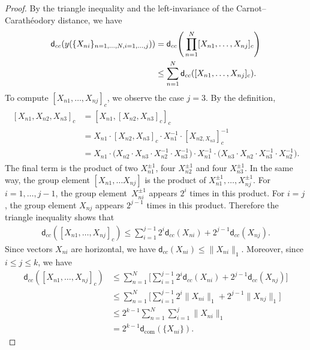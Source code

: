 \documentclass[10pt,a4paper]{amsart}
\numberwithin{equation}{section}
\begin{document}
\begin{proof}
 By the triangle inequality and the left-invariance of the Carnot--Carath\'eodory distance,
 we have
 \begin{align}
 \mathsf{d}_{cc}(y(\{X_{ni}\}_{n=1,\dots,N,i=1,\dots,j}))&=\mathsf{d}_{cc}
 \Bigg(\prod_{n=1}^N[X_{n1},\dots,X_{nj}]_c\Bigg) \notag \\
 &\leq \sum_{n=1}^N\mathsf{d}_{cc}([X_{n1},\dots,X_{nj}]_c).\label{eqyntri}
 \end{align}
 To compute $[X_{n1},\dots,X_{nj}]_c$,
 we observe the case $j=3$.
By the definition,
\begin{align*}
\begin{split}
 [X_{n1},X_{n2},X_{n3}]_c&=[X_{n1},[X_{n2},X_{n3}]_c]_c
 \\
 &=X_{n1}\cdot[X_{n2},X_{n3}]_c\cdot X_{n1}^{-1}\cdot[X_{n2,X_{n3}}]_c^{-1}
 \\
 &=X_{n1}\cdot \bigl(X_{n2}\cdot X_{n3}\cdot X_{n2}^{-1}\cdot X_{n3}^{-1}\bigr)\cdot X_{n1}^{-1}\cdot \bigl(X_{n3}\cdot X_{n2}\cdot X_{n3}^{-1}\cdot X_{n2}^{-1}\bigr).
 \end{split}
\end{align*}
The final term is the product of two $X_{n1}^{\pm1}$,
four $X_{n2}^{\pm 1}$ and four $X_{n3}^{\pm 1}$.
In the same way,
the group element $[X_{n1},\dots X_{nj}]$ is the product of $X_{n1}^{\pm 1},\dots,X_{nj}^{\pm 1}$.
 For $i=1,\dots,j-1$,
 the group ele\-ment~$X_{ni}^{\pm 1}$ appears $2^i$ times in this product.
 For $i=j$,
 the group element $X_{nj}$ appears $2^{j-1}$ times in this product.
Therefore the triangle inequality shows that
 \begin{gather}\label{eqytri}
 \mathsf{d}_{cc}([X_{n1},\dots,X_{nj}]_c)\leq \sum_{i=1}^{j-1}2^i\mathsf{d}_{cc}(X_{ni})+2^{j-1}\mathsf{d}_{cc}(X_{nj}).
 \end{gather}
Since vectors $X_{ni}$ are horizontal,
we have $\mathsf{d}_{cc}(X_{ni})\leq\|X_{ni}\|_1$.
Moreover,
since $i\leq j\leq k$,
we have
\begin{align*}
 \mathsf{d}_{cc}([X_{n1},\dots,X_{nj}]_c)
 &\leq\sum_{n=1}^N\Bigg[\sum_{i=1}^{j-1}2^i\mathsf{d}_{cc}(X_{ni})+2^{j-1}\mathsf{d}_{cc}(X_{nj})\Bigg]
 \\
& \leq\sum_{n=1}^N\Bigg[\sum_{i=1}^{j-1}2^i\|X_{ni}\|_1+2^{j-1}\|X_{nj}\|_1\Bigg]
\\
& \leq 2^{k-1}\sum_{n=1}^N\sum_{i=1}^j\|X_{ni}\|_1
\\
& = 2^{k-1}\mathsf{d}_{\mathrm{com}}(\{X_{ni}\}).\tag*{\qed}
\end{align*}
\renewcommand{\qed}{}
\end{proof}
\end{document}
